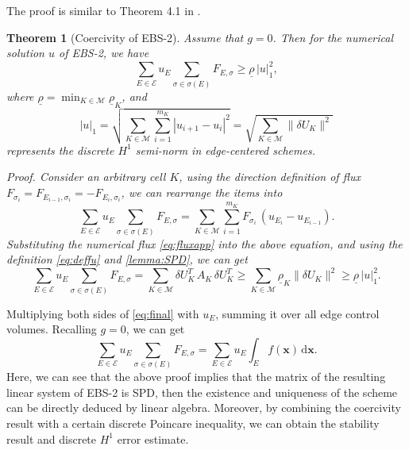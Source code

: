 \documentclass[times,review,preprint,authoryear]{elsarticle}
\newtheorem{theorem}{Theorem}
\newcommand{\bx}{\bm{x}}
\begin{document}
The proof is similar to Theorem 4.1 in \cite{dong_analysis_2020}.

\begin{theorem}[Coercivity of EBS-2]
Assume that $g = 0$. Then for the numerical solution $u$ of EBS-2, we have
\begin{equation}
\sum_{E \in \mathcal{E}} u_{E} \sum_{\sigma \in \sigma(E)} F_{E, \sigma} \geq \underline{\rho} \, |u|_{1}^2,
\end{equation}
where $\underline{\rho} = \min_{K \in \mathcal{M}} \underline{\rho}_{K}$, and 
$$|u|_{1} = \sqrt{ \sum_{K \in \mathcal{M}} \sum_{i=1}^{m_K} |u_{i+1} - u_{i}|^2 } = \sqrt{\sum_{K \in \mathcal{M}} \|\delta U_K\|^2 }$$
represents the discrete $H^1$ semi-norm in edge-centered schemes. 
\end{theorem}

\em{Proof.} Consider an arbitrary cell $K$, using the direction definition of flux $F_{\sigma_{i}} = F_{E_{i-1}, \sigma_{i}} = - F_{E_{i}, \sigma_{i}}$, we can rearrange the items into
\begin{equation*}
\sum_{E \in \mathcal{E}} u_{E} \sum_{\sigma \in \sigma(E)} F_{E, \sigma} = \sum_{K \in \mathcal{M}} \sum_{i=1}^{m_K} F_{\sigma_{i}} \, (u_{E_{i}} - u_{E_{i-1}}).
\end{equation*}
Substituting the numerical flux \cref{eq:fluxapp} into the above equation, and using the definition \cref{eq:deffu} and \cref{lemma:SPD}, we can get
\begin{equation*}
\sum_{E \in \mathcal{E}} u_{E} \sum_{\sigma \in \sigma(E)} F_{E, \sigma} = \sum_{K \in \mathcal{M}} \delta U_K^T \, A_K \, \delta U_K^T \geq \sum_{K \in \mathcal{M}} \underline{\rho}_K \|\delta U_K\|^2 \geq \underline{\rho} \, |u|_{1}^2.
\end{equation*}

Multiplying both sides of \cref{eq:final} with $u_E$, summing it over all edge control volumes. Recalling $g = 0$, we can get
\begin{equation*}
\sum_{E \in \mathcal{E}} u_{E} \sum_{\sigma \in \sigma(E)} F_{E, \sigma} = \sum_{E \in \mathcal{E}} u_{E} \int_{E} f(\bx) \, \mathrm{d} \bx.
\end{equation*}
Here, we can see that the above proof implies that the matrix of the resulting linear system of EBS-2 is SPD, then the existence and uniqueness of the scheme can be directly deduced by linear algebra. Moreover, by combining the coercivity result with a certain discrete Poincare inequality, we can obtain the stability result and discrete $H^1$ error estimate.
\end{document}
